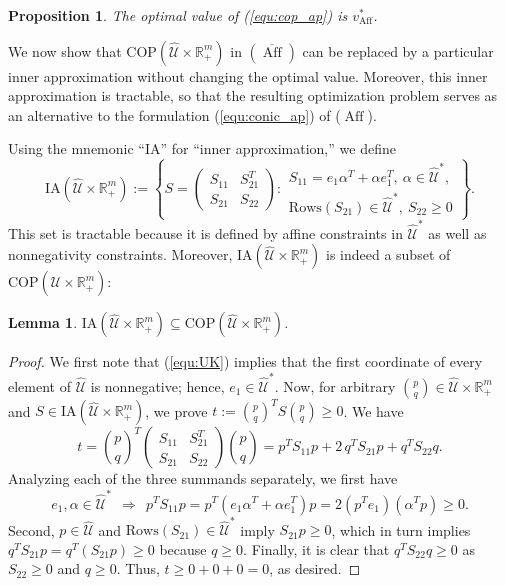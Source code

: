 \documentclass[12pt]{article}
\DeclareMathOperator{\AP}{Aff}
\newtheorem{lemma}{Lemma}
\newtheorem{proposition}{Proposition}
\newcommand{\K}{\widehat{\mathcal{U}}}
\newcommand{\COP}{{\mathrm{COP}}}
\newcommand{\M}{\mathrm{IA}}
\def\RR{{\mathbb{R}}}
\newcommand{\Q}{{\K \times \RR^m_+}}
\begin{document}
\begin{onehalfspace}
\begin{proposition} %
    The optimal value of (\ref{equ:cop_ap}) is $v^*_{\AP}$. 
\end{proposition}


We now show that $\COP(\Q)$ in $(\overline{\AP})$ can
be replaced by a particular inner approximation without changing the
optimal value. Moreover, this inner approximation is tractable, so that
the resulting optimization problem serves as an alternative to the formulation
(\ref{equ:conic_ap}) of ($\AP$).

Using the mnemonic ``IA'' for ``inner approximation,'' we define 
\[
\M(\Q) := \left\{
    S = \begin{pmatrix} S_{11} & S_{21}^T \\ S_{21} & S_{22} \end{pmatrix} : 
\begin{array}{l}
    S_{11} = e_1\alpha^T + \alpha e_1^T, \  \alpha \in \K^*, \\
    \text{Rows}(S_{21}) \in \K^*, \  S_{22} \ge 0
\end{array}
\right\}.
\]
This set is tractable because it is defined by affine constraints in
$\K^*$ as well as nonnegativity constraints. Moreover, $\M(\Q)$ is
indeed a subset of $\COP(\Q)$:

\begin{lemma} %
$\M(\Q) \subseteq \COP(\Q)$.
\end{lemma} 

\begin{proof}
We first note that (\ref{equ:UK}) implies that the first
coordinate of every element of $\K$ is nonnegative; hence, $e_1 \in
\K^*$. Now, for arbitrary ${p \choose q} \in \Q$ and $S
\in \M(\Q)$, we prove $t := {p \choose q}^T S {p \choose
q} \ge 0$. We have
\[
t 
= {p \choose q}^T
\begin{pmatrix} S_{11} & S_{21}^T \\ S_{21} & S_{22} \end{pmatrix}
{p \choose q}
= p^TS_{11}p + 2 \, q^TS_{21}p + q^TS_{22}q.
\]
Analyzing each of the three summands separately, we first have
\[
e_1, \alpha \in \K^* \ \ \Longrightarrow \ \
p^TS_{11}p = p^T(e_1\alpha^T + \alpha e_1^T)p = 2(p^Te_1)(\alpha^Tp) \ge 0.
\]
Second, $p \in \K$ and $\text{Rows}(S_{21}) \in \K^*$ imply $S_{21} p
\ge 0$, which in turn implies $q^TS_{21}p = q^T(S_{21}p) \ge 0$ because
$q \ge 0$. Finally, it is clear that $q^TS_{22}q \ge 0$ as $S_{22} \ge
0$ and $q \ge 0$. Thus, $t \ge 0 + 0 + 0 = 0$, as desired.
\end{proof}


\end{onehalfspace}
\end{document}
